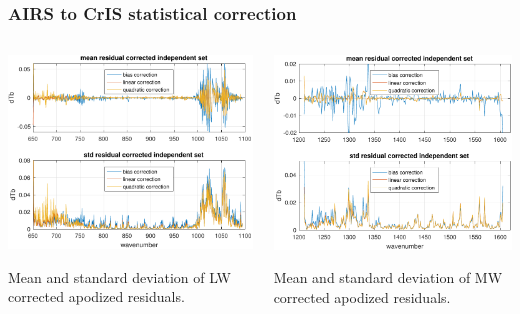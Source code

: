 \documentclass[10pt]{beamer}
\begin{document}
\begin{frame}
\frametitle{AIRS to CrIS statistical correction}
\begin{columns}[t]
\begin{column}{0.5\textwidth}
  \begin{centering}
  \includegraphics[width=\textwidth]{figures/a2cris_regr_LW.pdf}
  \end{centering}\vspace{3mm}
  Mean and standard deviation of LW corrected apodized residuals.

\end{column}
\begin{column}{0.5\textwidth}
  \begin{centering}
  \includegraphics[width=\textwidth]{figures/a2cris_regr_MW.pdf}
  \end{centering}\vspace{3mm}
  Mean and standard deviation of MW corrected apodized residuals.
 
\end{column}
\end{columns}
\end{frame}
\end{document}
